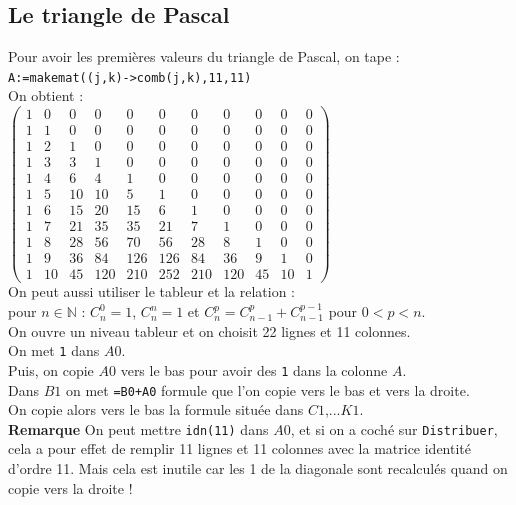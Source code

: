 \documentclass[a4paper,11pt]{book}
\newcommand{\N}{{\mathbb{N}}}
\begin{document}
\subsection{Le triangle de Pascal}
Pour avoir les premi\`eres valeurs du triangle de Pascal, on tape :\\
{\tt A:=makemat((j,k)->comb(j,k),11,11)}\\
On obtient :\\
$\left(\begin{array}{ccccccccccc}
1 & 0 & 0 & 0 & 0 & 0 & 0 & 0 & 0 & 0 & 0 \\
1 & 1 & 0 & 0 & 0 & 0 & 0 & 0 & 0 & 0 & 0 \\
1 & 2 & 1 & 0 & 0 & 0 & 0 & 0 & 0 & 0 & 0 \\
1 & 3 & 3 & 1 & 0 & 0 & 0 & 0 & 0 & 0 & 0 \\
1 & 4 & 6 & 4 & 1 & 0 & 0 & 0 & 0 & 0 & 0 \\
1 & 5 & 10 & 10 & 5 & 1 & 0 & 0 & 0 & 0 & 0 \\
1 & 6 & 15 & 20 & 15 & 6 & 1 & 0 & 0 & 0 & 0 \\
1 & 7 & 21 & 35 & 35 & 21 & 7 & 1 & 0 & 0 & 0 \\
1 & 8 & 28 & 56 & 70 & 56 & 28 & 8 & 1 & 0 & 0\\
1 & 9 & 36 & 84 & 126 & 126 & 84 & 36 & 9 & 1 & 0 \\
1 & 10 & 45 & 120 & 210 & 252 & 210 & 120 & 45 & 10 & 1
\end{array}\right) $\\
On peut aussi utiliser le tableur et la relation :\\
pour $n \in \N$ :
$C_n^0=1$, $C_n^n=1$ et  $C_n^p=C_{n-1}^p+C_{n-1}^{p-1}$ pour $0<p<n$.\\
On ouvre un niveau tableur et on choisit 22 lignes et 11 colonnes.\\
On met {\tt 1} dans $A0$.\\
Puis, on copie $A0$ vers le bas pour avoir des {\tt 1} dans la colonne $A$.\\
Dans $B1$ on met {\tt =B0+A0} formule que l'on copie vers le bas et vers la 
droite.\\
On copie alors vers le bas la formule situ\'ee dans $C1$,...$K1$.\\
{\bf Remarque} On peut mettre {\tt idn(11)} dans $A0$, et si on a 
coch\'e sur {\tt Distribuer}, cela a pour effet de remplir 11 lignes et 11 
colonnes avec la matrice identit\'e d'ordre 11. Mais cela est inutile car les 
1 de la diagonale sont recalcul\'es quand on copie vers la droite !\\
\end{document}
